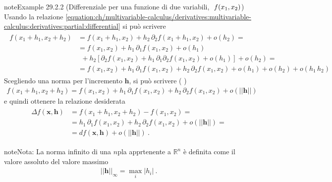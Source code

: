 \documentclass[letterpaper,10pt,italian]{jupyterBook}
\begin{document}
\begin{sphinxadmonition}{note}{Example 29.2.2 (Differenziale per una funzione di due variabili, \protect\(\ f(x_1, x_2) \protect\))}
\sphinxAtStartPar
Usando la relazione \eqref{equation:ch/multivariable-calculus/derivatives:multivariable-calculus:derivatives:partial:differential} si può scrivere
\begin{equation*}
\begin{split}\begin{aligned}
f(x_1 + h_1, x_2 + h_2)
  & = f(x_1 + h_1, x_2 ) + h_2 \, \partial_{2} f(x_1 + h_1, x_2) + o(h_2) = \\
  & = f(x_1, x_2) + h_1 \, \partial_{1} f(x_1, x_2) + o(h_1) \\
  & \ \ + h_2 \left[ \partial_{2} f(x_1, x_2) + h_1 \, \partial_{1}\partial_{2} f(x_1, x_2) + o (h_1) \right] + o(h_2) = \\
  & = f(x_1, x_2) + h_1 \, \partial_{1} f(x_1, x_2) + h_2 \, \partial_{2} f(x_1, x_2) + o(h_1) + o(h_2) + o(h_1 \, h_2) 
\end{aligned}\end{split}
\end{equation*}
\sphinxAtStartPar
Scegliendo una norma per l’incremento \(\mathbf{h}\), si può scrivere ( )
\begin{equation*}
\begin{split}
f(x_1 + h_1, x_2 + h_2) = f(x_1, x_2) + h_1 \, \partial_{1} f(x_1, x_2) + h_2 \, \partial_{2} f(x_1, x_2) + o(||\mathbf{h}||)
\end{split}
\end{equation*}
\sphinxAtStartPar
e quindi ottenere la relazione desiderata
\begin{equation*}
\begin{split}\begin{aligned}
\Delta f(\mathbf{x}, \mathbf{h}) & = f(x_1 + h_1, x_2 + h_2) - f(x_1, x_2) = \\
                                 & = h_1 \, \partial_{1} f(x_1, x_2) + h_2 \, \partial_{2} f(x_1, x_2) + o(||\mathbf{h}||) = \\
                                 & = d f(\mathbf{x}, \mathbf{h}) + o(||\mathbf{h}||) \ .
\end{aligned}\end{split}
\end{equation*}\end{sphinxadmonition}

\begin{sphinxadmonition}{note}{Nota:}
\sphinxAtStartPar
{}
La norma infinito di una \(n\)\sphinxhyphen{}pla apprtenente a \(\mathbb{R}^n\) è definita come il valore assoluto del valore massimo
\begin{equation*}
\begin{split}||\mathbf{h}||_{\infty} = \max_i |h_i| \ .\end{split}
\end{equation*}\end{sphinxadmonition}
\end{document}
